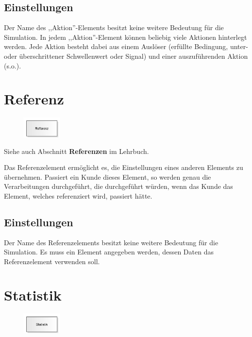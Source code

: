 \subsection*{Einstellungen}

Der Name des ,,Aktion''-Elements besitzt keine weitere Bedeutung für die Simulation.
In jedem ,,Aktion''-Element können beliebig viele Aktionen hinterlegt werden. Jede
Aktion besteht dabei aus einem Auslöser (erfüllte Bedingung, unter- oder überschrittener
Schwellenwert oder Signal) und einer auszuführenden Aktion (s.o.).


\section{Referenz}
\label{ref:ModelElementReference}

\begin{figure}
\vspace{-22pt}
\includegraphics[width=2cm]{imageModelElementReference.png}
\vspace{-22pt}
\end{figure}

Siehe auch Abschnitt \textbf{Referenzen} im Lehrbuch.

Das Referenzelement ermöglicht es, die Einstellungen eines anderen Elements zu übernehmen.
Passiert ein Kunde dieses Element, so werden genau die Verarbeitungen durchgeführt, die
durchgeführt würden, wenn das Kunde das Element, welches referenziert wird, passiert hätte.

\subsection*{Einstellungen}

Der Name des Referenzelements besitzt keine weitere Bedeutung für die Simulation.
Es muss ein Element angegeben werden, dessen Daten das Referenzelement verwenden soll.


\section{Statistik}
\label{ref:ModelElementUserStatistic}

\begin{figure}
\vspace{-22pt}
\includegraphics[width=2cm]{imageModelElementUserStatistic.png}
\vspace{-22pt}
\end{figure}

